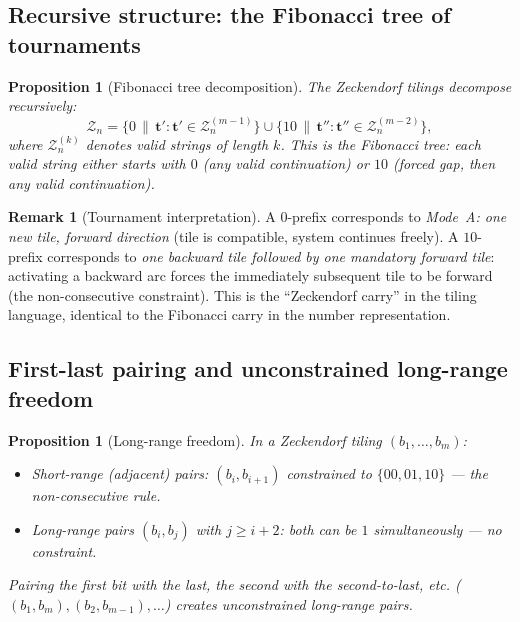 \documentclass[12pt,reqno]{amsart}
\newtheorem{proposition}[theorem]{Proposition}
\theoremstyle{definition}
\newtheorem{remark}[theorem]{Remark}
\theoremstyle{plain}
\begin{document}
\subsection{Recursive structure: the Fibonacci tree of tournaments}
\label{ssec:fib-tree}

\begin{proposition}[Fibonacci tree decomposition]\label{prop:fib-tree}
The Zeckendorf tilings decompose recursively:
\[
  \mathcal{Z}_n=
  \bigl\{0\,\|\,\mathbf{t}':\mathbf{t}'\in\mathcal{Z}_n^{(m-1)}\bigr\}
  \cup
  \bigl\{10\,\|\,\mathbf{t}'':\mathbf{t}''\in\mathcal{Z}_n^{(m-2)}\bigr\},
\]
where $\mathcal{Z}_n^{(k)}$ denotes valid strings of length $k$.
This is the \emph{Fibonacci tree}: each valid string either starts with
$0$ (any valid continuation) or $10$ (forced gap, then any valid continuation).
\end{proposition}

\begin{remark}[Tournament interpretation]
A $0$-prefix corresponds to \emph{Mode~A: one new tile, forward direction}
(tile is compatible, system continues freely).
A $10$-prefix corresponds to \emph{one backward tile followed by one mandatory forward tile}:
activating a backward arc forces the immediately subsequent tile to be forward
(the non-consecutive constraint).  This is the ``Zeckendorf carry'' in the
tiling language, identical to the Fibonacci carry in the number representation.
\end{remark}

\subsection{First-last pairing and unconstrained long-range freedom}
\label{ssec:firstlast}

\begin{proposition}[Long-range freedom]
In a Zeckendorf tiling $(b_1,\ldots,b_m)$:
\begin{itemize}
\item \emph{Short-range} (adjacent) pairs: $(b_i,b_{i+1})$ constrained to
  $\{00,01,10\}$ — the non-consecutive rule.
\item \emph{Long-range} pairs $(b_i,b_j)$ with $j\ge i+2$:
  both can be $1$ simultaneously — \emph{no constraint}.
\end{itemize}
Pairing the first bit with the last, the second with the second-to-last, etc.
($(b_1,b_m),(b_2,b_{m-1}),\ldots$) creates \emph{unconstrained} long-range pairs.
\end{proposition}
\end{document}
